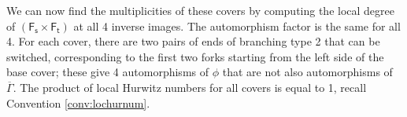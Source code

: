 \documentclass[11pt,reqno]{amsart}
\theoremstyle{definition}
\newcommand{\Ft}{\mathsf{F_t}}
\newcommand{\Fs}{\mathsf{F_s}}
\begin{document}
We can now find the multiplicities of these covers by computing the local degree of $(\Fs\times\Ft)$ at all 4 inverse images. The automorphism factor is the same for all 4. For each cover, there are two pairs of ends of branching type 2 that can be switched, corresponding to the first two forks starting from the left side of the base cover; these give 4 automorphisms of $\phi$ that are not also automorphisms of $\overline{\Gamma}$. The product of local Hurwitz numbers for all covers is equal to 1, recall Convention \ref{conv:lochurnum}. 

\end{document}
